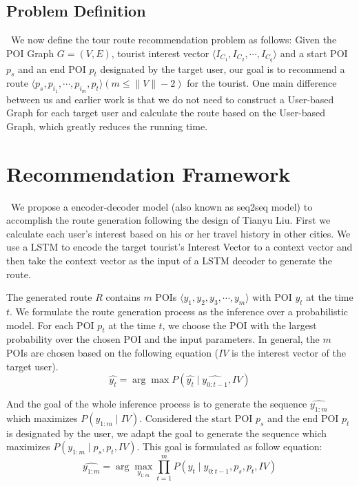 \documentclass[runningheads]{llncs}
\begin{document}
\subsection{Problem Definition}
\quad\, We now define the tour route recommendation problem as follows: Given the POI Graph $G=(V,E)$, tourist interest vector $\langle I_{C_1}, I_{C_2},\cdots, I_{C_q}\rangle$ and a start POI $p_s$ and an end POI $p_t$ designated by the target user, our goal is to recommend a route $\langle p_s,p_{i_1},\cdots,p_{i_m},p_t\rangle(m\leq\|V\|-2)$ for the tourist. One main difference between us and earlier work is that we do not need to construct a User-based Graph for each target user and calculate the route based on the User-based Graph, which greatly reduces the running time. 

\section{Recommendation Framework}
\quad\, We propose a encoder-decoder model (also known as seq2seq model) to accomplish the route generation following the design of Tianyu Liu\cite{AAAI1816599}. First we calculate each user's interest based on his or her travel history in other cities. We use a LSTM to encode the target tourist's Interest Vector to a context vector and then take the context vector as the input of a LSTM decoder to generate the route. 

The generated route $R$ contains $m$ POIs $\langle y_1,y_2,y_3,\cdots,y_m\rangle$ with POI $y_t$ at the time $t$. We formulate the route generation process as the inference over a probabilistic model. For each POI $p_t$ at the time $t$, we choose the POI with the largest probability over the chosen POI and the input parameters. In general, the $m$ POIs are chosen based on the following equation ($IV$ is the interest vector of the target user).
\begin{equation}
	\hat{y_t}=\arg\max P(\hat{y_t}\mid\hat{y_{0:t-1}},IV)
\end{equation}

And the goal of the whole inference process is to generate the sequence $\hat{y_{1:m}}$ which maximizes $P(y_{1:m}\mid IV)$. Considered the start POI $p_s$ and the end POI $p_t$ is designated by the user, we adapt the goal to generate the sequence which maximizes $P(y_{1:m}\mid p_s, p_t, IV)$. This goal is formulated as follow equation:
\begin{equation}
    \label{eqn2}
	\hat{y_{1:m}}=\arg\max_{y_{1:m}}\prod_{t=1}^{m}P(y_t\mid y_{0:t-1},p_s,p_t,IV)
\end{equation}
\end{document}
